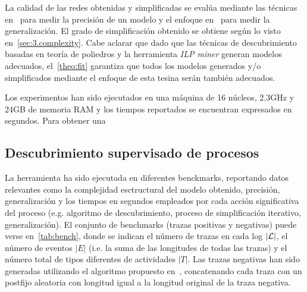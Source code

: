 La calidad de las redes obtenidas y simplificadas se evalúa mediante las técnicas en~\cite{AMCDA15} para medir
la precisión de un modelo y el enfoque en~\cite{BrouckeWVB14} para medir la generalización. El grado de
simplificación obtenido se obtiene según lo visto en~\autoref{sec:3.complexity}.
Cabe aclarar que dado que las técnicas de descubrimiento basadas en teoría de poliedros y la herramienta \textit{ILP miner}
generan modelos adecuados, el~\autoref{theo:fit} garantiza que todos los modelos generados y/o simplificados
mediante el enfoque de esta tesina serán también adecuados.

Los experimentos han sido ejecutados en una máquina de 16 núcleos, 2.3GHz y 24GB de memoria RAM y los tiempos
reportados se encuentran expresados en segundos.
Para obtener una 

\subsection{Descubrimiento supervisado de procesos}
\label{sec:4.supervised}



La herramienta ha sido ejecutada en diferentes benckmarks, reportando datos relevantes como la 
complejidad esctructural del modelo obtenido, precisión, generalización y los tiempos en segundos 
empleados por cada acción significativa del proceso (e.g. algoritmo de descubrimiento,
proceso de simplificación iterativo, generalización).
El conjunto de benchmarks (trazas positivas y negativas) puede verse en~\autoref{tab:bench}, donde se
indican el número de trazas en cada log $|{\mathcal L}|$, el número de eventos $|E|$ (i.e. la suma de las 
longitudes de todas las trazas) y el número total de tipos diferentes de actividades $|T|$.
Las trazas negativas han sido generadas utilizando el algoritmo propuesto en~\cite{BrouckeWVB14},
concatenando cada traza con un postfijo aleatoria con longitud igual a la longitud original de la traza
negativa.

